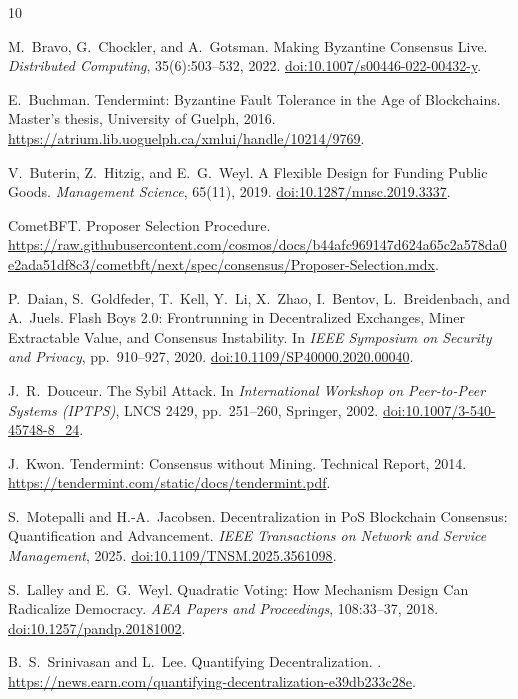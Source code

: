 \documentclass[11pt,a4paper]{article}
\begin{document}

\begin{thebibliography}{10}

M.~Bravo, G.~Chockler, and A.~Gotsman.
\newblock Making Byzantine Consensus Live.
\newblock \textit{Distributed Computing}, 35(6):503--532, 2022.
\newblock \href{https://doi.org/10.1007/s00446-022-00432-y}{doi:10.1007/s00446-022-00432-y}.

E.~Buchman.
\newblock Tendermint: Byzantine Fault Tolerance in the Age of Blockchains.
\newblock Master's thesis, University of Guelph, 2016.
\newblock \url{https://atrium.lib.uoguelph.ca/xmlui/handle/10214/9769}.

V.~Buterin, Z.~Hitzig, and E.~G.~Weyl.
\newblock A Flexible Design for Funding Public Goods.
\newblock \textit{Management Science}, 65(11), 2019.
\newblock \href{https://doi.org/10.1287/mnsc.2019.3337}{doi:10.1287/mnsc.2019.3337}.

CometBFT.
\newblock Proposer Selection Procedure.
\newblock \url{https://raw.githubusercontent.com/cosmos/docs/b44afc969147d624a65c2a578da0e2ada51df8c3/cometbft/next/spec/consensus/Proposer-Selection.mdx}.

P.~Daian, S.~Goldfeder, T.~Kell, Y.~Li, X.~Zhao, I.~Bentov, L.~Breidenbach, and A.~Juels.
\newblock Flash Boys 2.0: Frontrunning in Decentralized Exchanges, Miner Extractable Value, and Consensus Instability.
\newblock In \textit{IEEE Symposium on Security and Privacy}, pp.~910--927, 2020.
\newblock \href{https://doi.org/10.1109/SP40000.2020.00040}{doi:10.1109/SP40000.2020.00040}.

J.~R.~Douceur.
\newblock The Sybil Attack.
\newblock In \textit{International Workshop on Peer-to-Peer Systems (IPTPS)}, LNCS 2429, pp.~251--260, Springer, 2002.
\newblock \href{https://doi.org/10.1007/3-540-45748-8_24}{doi:10.1007/3-540-45748-8\_24}.

J.~Kwon.
\newblock Tendermint: Consensus without Mining.
\newblock Technical Report, 2014.
\newblock \url{https://tendermint.com/static/docs/tendermint.pdf}.

S.~Motepalli and H.-A.~Jacobsen.
\newblock Decentralization in PoS Blockchain Consensus: Quantification and Advancement.
\newblock \textit{IEEE Transactions on Network and Service Management}, 2025.
\newblock \href{https://doi.org/10.1109/TNSM.2025.3561098}{doi:10.1109/TNSM.2025.3561098}.

S.~Lalley and E.~G.~Weyl.
\newblock Quadratic Voting: How Mechanism Design Can Radicalize Democracy.
\newblock \textit{AEA Papers and Proceedings}, 108:33--37, 2018.
\newblock \href{https://doi.org/10.1257/pandp.20181002}{doi:10.1257/pandp.20181002}.

B.~S.~Srinivasan and L.~Lee.
\newblock Quantifying Decentralization.
.
\newblock \url{https://news.earn.com/quantifying-decentralization-e39db233c28e}.

\end{thebibliography}
\end{document}
